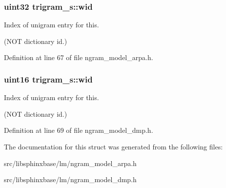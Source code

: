 \subsubsection[{wid}]{\setlength{\rightskip}{0pt plus 5cm}uint32 trigram\-\_\-s\-::wid}\label{structtrigram__s_a492e1fedb16fa11d26a941177c1305be}


Index of unigram entry for this. 

(N\-O\-T dictionary id.) 

Definition at line 67 of file ngram\-\_\-model\-\_\-arpa.\-h.

\subsubsection[{wid}]{\setlength{\rightskip}{0pt plus 5cm}uint16 trigram\-\_\-s\-::wid}\label{structtrigram__s_ad90726c9d1c5b2d564205b4feddcb674}


Index of unigram entry for this. 

(N\-O\-T dictionary id.) 

Definition at line 69 of file ngram\-\_\-model\-\_\-dmp.\-h.



The documentation for this struct was generated from the following files\-:\begin{DoxyCompactItemize}
\item 
src/libsphinxbase/lm/ngram\-\_\-model\-\_\-arpa.\-h\item 
src/libsphinxbase/lm/ngram\-\_\-model\-\_\-dmp.\-h\end{DoxyCompactItemize}
